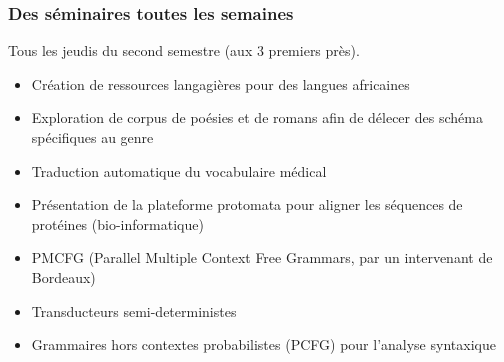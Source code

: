 \documentclass{beamer}
\begin{document}
\begin{frame}
  \frametitle{Des séminaires toutes les semaines}
  Tous les jeudis du second semestre (aux 3 premiers près).
  \begin{itemize}
  \item Création de ressources langagières pour des langues africaines
  \item Exploration de corpus de poésies et de romans afin de délecer
    des schéma spécifiques au genre
  \item Traduction automatique du vocabulaire médical
  \item Présentation de la plateforme protomata pour aligner les
    séquences de protéines (bio-informatique)
  \item PMCFG (Parallel Multiple Context Free Grammars, par un intervenant
    de Bordeaux)
  \item Transducteurs semi-deterministes
  \item Grammaires hors contextes probabilistes (PCFG) pour l'analyse syntaxique
  \end{itemize}
\end{frame}
\end{document}
